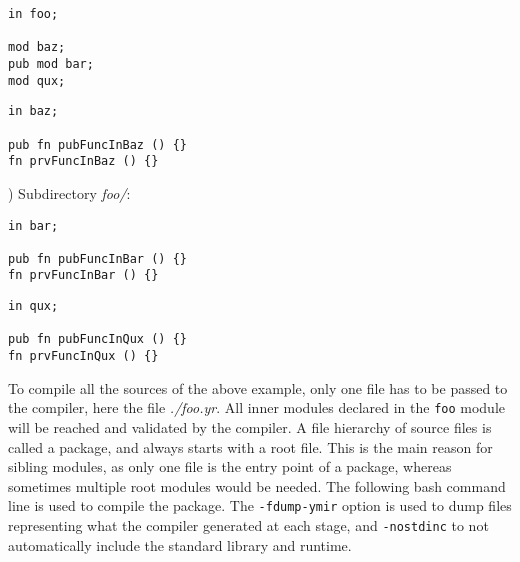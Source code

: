 \vspace{-5pt}%
\begin{minipage}[t][][t]{0.47\linewidth}
\begin{lstlisting}[caption=\textit{./foo.yr}, style=coloredverbatim]
in foo;

mod baz;
pub mod bar;
mod qux;

\end{lstlisting}
\end{minipage}\hspace{5pt}%
\begin{minipage}[t][][t]{0.47\linewidth}
\begin{lstlisting}[caption=\textit{./baz.yr}, style=coloredverbatim]
in baz;

pub fn pubFuncInBaz () {}
fn prvFuncInBaz () {}
\end{lstlisting}
\end{minipage}


) Subdirectory \textit{foo/}:

\vspace{-5pt}%
\begin{minipage}[t][][t]{0.47\linewidth}
\begin{lstlisting}[caption=\textit{./foo/bar.yr}, style=coloredverbatim]
in bar;

pub fn pubFuncInBar () {}
fn prvFuncInBar () {}
\end{lstlisting}
\end{minipage}\hspace{5pt}%
\begin{minipage}[t][][t]{0.47\linewidth}
\begin{lstlisting}[caption=\textit{./foo/qux.yr}, style=coloredverbatim]
in qux;

pub fn pubFuncInQux () {}
fn prvFuncInQux () {}
\end{lstlisting}
\end{minipage}


To compile all the sources of the above example, only one file has to be passed
to the compiler, here the file \textit{./foo.yr}. All inner modules declared in
the \texttt{foo} module will be reached and validated by the compiler. A file
hierarchy of source files is called a package, and always starts with a root
file. This is the main reason for sibling modules, as only one file is the entry
point of a package, whereas sometimes multiple root modules would be needed. The
following bash command line is used to compile the package. The
\texttt{-fdump-ymir} option is used to dump files representing what the compiler
generated at each stage, and \texttt{-nostdinc} to not automatically include the
standard library and runtime.

